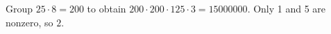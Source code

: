 Group $25\cdot8=200$ to obtain $200\cdot200\cdot125\cdot3=15000000$. Only 1 and 5 are nonzero, so $\boxed2$.
